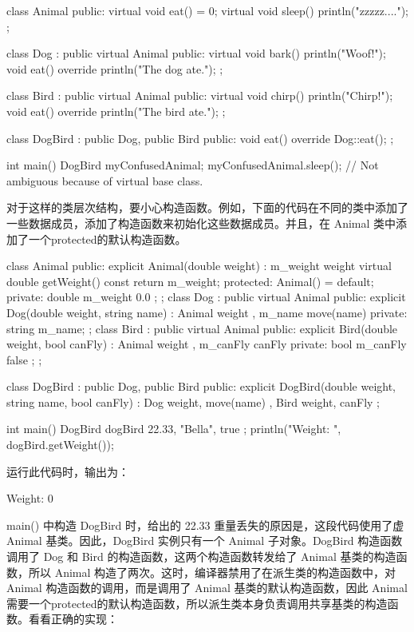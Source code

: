 \begin{cpp}
class Animal
{
    public:
        virtual void eat() = 0;
        virtual void sleep() { println("zzzzz...."); }
};

class Dog : public virtual Animal
{
    public:
        virtual void bark() { println("Woof!"); }
        void eat() override { println("The dog ate."); }
};

class Bird : public virtual Animal
{
    public:
        virtual void chirp() { println("Chirp!"); }
        void eat() override { println("The bird ate."); }
};

class DogBird : public Dog, public Bird
{
    public:
        void eat() override { Dog::eat(); }
};

int main()
{
    DogBird myConfusedAnimal;
    myConfusedAnimal.sleep(); // Not ambiguous because of virtual base class.
}
\end{cpp}

对于这样的类层次结构，要小心构造函数。例如，下面的代码在不同的类中添加了一些数据成员，添加了构造函数来初始化这些数据成员。并且，在 Animal 类中添加了一个protected的默认构造函数。

\begin{cpp}
class Animal
{
    public:
        explicit Animal(double weight) : m_weight { weight } {}
        virtual double getWeight() const { return m_weight; }
    protected:
        Animal() = default;
    private:
        double m_weight { 0.0 };
};
class Dog : public virtual Animal
{
    public:
        explicit Dog(double weight, string name)
            : Animal { weight }, m_name { move(name) } {}
    private:
        string m_name;
};
class Bird : public virtual Animal
{
    public:
        explicit Bird(double weight, bool canFly)
            : Animal { weight }, m_canFly { canFly } {}
    private:
        bool m_canFly { false };
};

class DogBird : public Dog, public Bird
{
    public:
        explicit DogBird(double weight, string name, bool canFly)
            : Dog { weight, move(name) }, Bird { weight, canFly } {}
};

int main()
{
    DogBird dogBird { 22.33, "Bella", true };
    println("Weight: {}", dogBird.getWeight());
}
\end{cpp}

运行此代码时，输出为：

\begin{cpp}
Weight: 0
\end{cpp}

main() 中构造 DogBird 时，给出的 22.33 重量丢失的原因是，这段代码使用了虚 Animal 基类。因此，DogBird 实例只有一个 Animal 子对象。DogBird 构造函数调用了 Dog 和 Bird 的构造函数，这两个构造函数转发给了 Animal 基类的构造函数，所以 Animal 构造了两次。这时，编译器禁用了在派生类的构造函数中，对 Animal 构造函数的调用，而是调用了 Animal 基类的默认构造函数，因此 Animal 需要一个protected的默认构造函数，所以派生类本身负责调用共享基类的构造函数。看看正确的实现：

